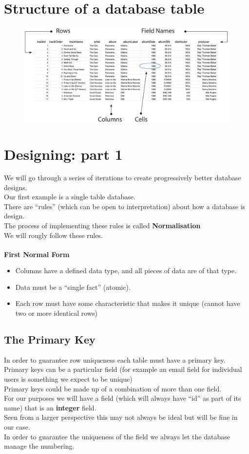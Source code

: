 \documentclass[a4paper,12pt]{article}
\begin{document}
	\section{Structure of a database table}
	\begin{figure}[!h]
		\centering
		\includegraphics[width=16.5cm]{dBase_digram_copy.pdf}
	\end{figure}
\section{Designing: part 1}
We will go through a series of iterations to create progressively better database designs.\\
Our first example is a single table database.\\
There are ``rules'' (which can be open to interpretation) about how a database is design.\\
The process of implementing these rules is called \textbf{Normalisation}\\
We will rougly follow these rules.\\\\
\textbf{First Normal Form}
\begin{itemize}
	\item Columns have a defined data type, and all pieces of data are of that type.
	\item Data must be a ``single fact'' (atomic).
	\item Each row must have some characteristic that makes it unique (cannot have two or more identical rows)
\end{itemize}
\subsection{The Primary Key}
In order to guarantee row uniqueness each table must have a primary key.\\
Primary keys can be a particular field (for example an email field for individual users is something we expect to be unique)\\
Primary keys could be made up of a combination of more than one field.\\
For our purposes we will have a field (which will always have ``id'' as part of its name) that is an \textbf{integer} field.\\
Seen from a larger perspective this may not always be ideal but will be fine in our case.  \\
In order to guarantee the uniqueness of the field we always let the database manage the numbering.
\newpage
\end{document}
